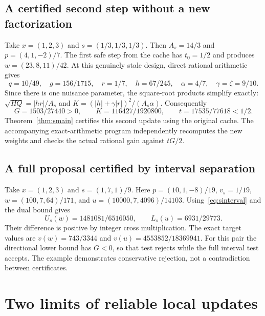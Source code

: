 \documentclass[11pt]{article}
\begin{document}
\subsection{A certified second step without a new factorization}
Take $x=(1,2,3)$ and $s=(1/3,1/3,1/3)$.
Then $A_s=14/3$ and $p=(4,1,-2)/7$.
The first safe step from the cache has $t_0=1/2$ and produces
$w=(23,8,11)/42$.
At this genuinely stale design, direct rational arithmetic gives
\[
 q=10/49,\quad g=156/1715,\quad r=1/7,\quad h=67/245,
 \quad\alpha=4/7,\quad\gamma=\zeta=9/10.
\]
Since there is one nuisance parameter, the square-root products simplify exactly:
$\sqrt{HQ}=|hr|/A_s$ and
$K=(|h|+\gamma|r|)^2/(A_s\alpha)$.
Consequently
\[
 G=1503/27440>0,\qquad K=116427/1920800,\qquad
 t=17535/77618<1/2.
\]
Theorem~\ref{thm:smain} certifies this second update using the original cache. The accompanying exact-arithmetic program independently recomputes the new weights and checks the actual rational gain against $tG/2$.

\subsection{A full proposal certified by interval separation}
Take $x=(1,2,3)$ and $s=(1,7,1)/9$.
Here $p=(10,1,-8)/19$, $v_s=1/19$,
$w=(100,7,64)/171$, and $u=(10000,7,4096)/14103$.
Using~\eqref{eq:sinterval} and the dual bound gives
\[
 U_s(w)=1481081/6516050,
 \qquad L_s(u)=6931/29773.
\]
Their difference is positive by integer cross multiplication.
The exact target values are $v(w)=743/3344$ and
$v(u)=4553852/18369941$.
For this pair the directional lower bound has $G<0$, so that test rejects while the full interval test accepts. The example demonstrates conservative rejection, not a contradiction between certificates.


\section{Two limits of reliable local updates}
\end{document}
